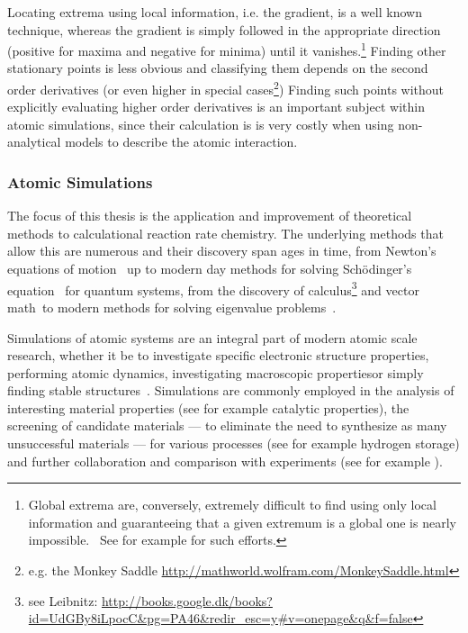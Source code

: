 Locating extrema using local information, i.e. the gradient, is a well known technique\citemiss, whereas the gradient is simply followed in the appropriate direction (positive for maxima and negative for minima) until it vanishes.\footnote{Global extrema are, conversely, extremely difficult to find using only local information and guaranteeing that a given extremum is a global one is nearly impossible.~\cite{Stillinger1999} See for example \cite{Wang2010, Wales1999, Pickard2011, Oganov2008, Kirkpatrick1983, Johnston2003, Fischer2006} for such efforts.}
Finding other stationary points is less obvious and classifying them depends on the second order derivatives (or even higher in special cases\footnote{e.g. the Monkey Saddle \url{http://mathworld.wolfram.com/MonkeySaddle.html}})
Finding such points without explicitly evaluating higher order derivatives is an important subject within atomic simulations, since their calculation is is very costly when using non-analytical  models to describe the atomic interaction.

\subsubsection{Atomic Simulations}
The focus of this thesis is the application and improvement of theoretical methods to calculational reaction rate chemistry.
The underlying methods that allow this are numerous and their discovery span ages in time, from Newton's equations of motion~\cite{newton-latin} up to modern day methods for solving Sch\"odinger's equation~\cite{schrodinger-equation-1926} for quantum systems\cite{hohenberg-kohn-1964, gpaw-review-2010, dacapo-1999}, from the discovery of calculus\citemiss\footnote{see Leibnitz: \url{http://books.google.dk/books?id=UdGBy8iLpocC&pg=PA46&redir_esc=y\#v=onepage&q&f=false}} and vector math~\citemiss to modern methods for solving eigenvalue problems~\cite{eigenvalue-problems-2000}.

Simulations of atomic systems are an integral part of modern atomic scale research, whether it be to investigate specific electronic structure properties\citemiss, performing atomic dynamics\citemiss, investigating macroscopic properties\citemiss or simply finding stable structures~\citemiss.
Simulations are commonly employed in the analysis of interesting material properties (see for example catalytic properties\citemiss), the screening of candidate materials --- to eliminate the need to synthesize as many unsuccessful materials --- for various processes (see for example hydrogen storage\citemiss) and further collaboration and comparison with experiments (see for example \citemiss).

